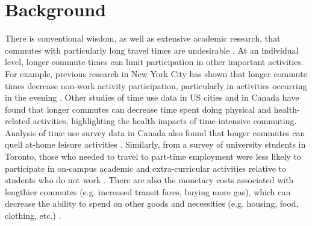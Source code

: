 \documentclass[10 pt,letterpaper]{article}
\begin{document}
\section{Background}



There is conventional wisdom, as well as extensive academic research, that commutes with particularly long travel times are undesirable \cite{marion_comparison_2007,maoh_determinants_2012-1,vincent-geslin_determinants_2016,bai_exploring_2020}. At an individual level, longer commute times can limit participation in other important activities. For example, previous research in New York City has shown that longer commute times decrease non-work activity participation, particularly in activities occurring in the evening \cite{chu_modeling_2005}. Other studies of time use data in US cities \cite{christian_trade-offs_2012} and in Canada \cite{hilbrecht_highway_2014} have found that longer commutes can decrease time spent doing physical and health-related activities, highlighting the health impacts of time-intensive commuting. Analysis of time use survey data in Canada also found that longer commutes can quell at-home leisure activities \cite{farber_running_2011, hilbrecht_highway_2014}. Similarly, from a survey of university students in Toronto, those who needed to travel to part-time employment were less likely to participate in on-campus academic and extra-curricular activities relative to students who do not work \cite{allen_how_2018}. There are also the monetary costs associated with lengthier commutes (e.g. increased transit fares, buying more gas), which can decrease the ability to spend on other goods and necessities (e.g. housing, food, clothing, etc.) \cite{lyons_human_2008}.
\end{document}

